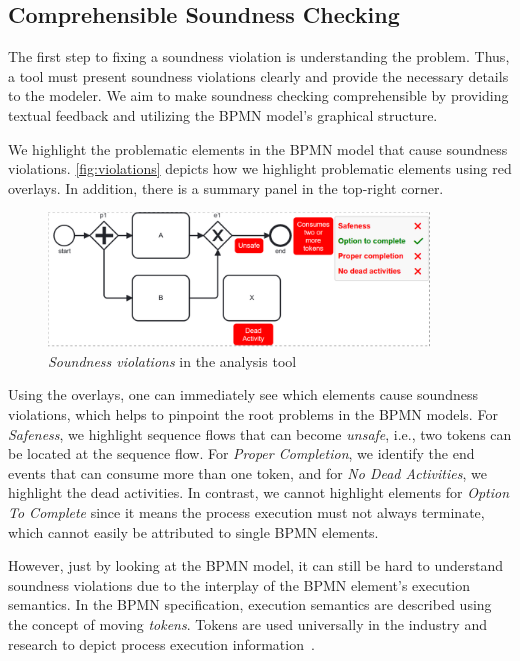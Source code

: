 \documentclass[runningheads]{llncs}
\begin{document}
\subsection{Comprehensible Soundness Checking}

The first step to fixing a soundness violation is understanding the problem.
Thus, a tool must present soundness violations clearly and provide the necessary details to the modeler.
We aim to make soundness checking comprehensible by providing textual feedback and utilizing the BPMN model's graphical structure.

We highlight the problematic elements in the BPMN model that cause soundness violations.
\autoref{fig:violations} depicts how we highlight problematic elements using red overlays.
In addition, there is a summary panel in the top-right corner.

\begin{figure}[ht]
	\centering
	\includegraphics[width=0.9\textwidth]{images/violations}
	\caption{\textit{Soundness violations} in the analysis tool}
	\label{fig:violations}
\end{figure}

Using the overlays, one can immediately see which elements cause soundness violations, which helps to pinpoint the root problems in the BPMN models.
For \textit{Safeness}, we highlight sequence flows that can become \textit{unsafe}, i.e., two tokens can be located at the sequence flow.
For \textit{Proper Completion}, we identify the end events that can consume more than one token, and for \textit{No Dead Activities}, we highlight the dead activities.
In contrast, we cannot highlight elements for \textit{Option To Complete} since it means the process execution must not always terminate, which cannot easily be attributed to single BPMN elements.

However, just by looking at the BPMN model, it can still be hard to understand soundness violations due to the interplay of the BPMN element's execution semantics.
In the BPMN specification, execution semantics are described using the concept of moving \textit{tokens}.
Tokens are used universally in the industry and research to depict process execution information~\cite{camundaservicesgmbhBpmnjsTokenSimulation2024,corradiniFormalApproachAnalysis2021,corradiniFormalisingAnimatingMultiple2022,houhouFirstOrderLogicVerification2022,krauterFormalizationAnalysisBPMN2023,krauterHigherorderTransformationApproach2023}.
\end{document}
